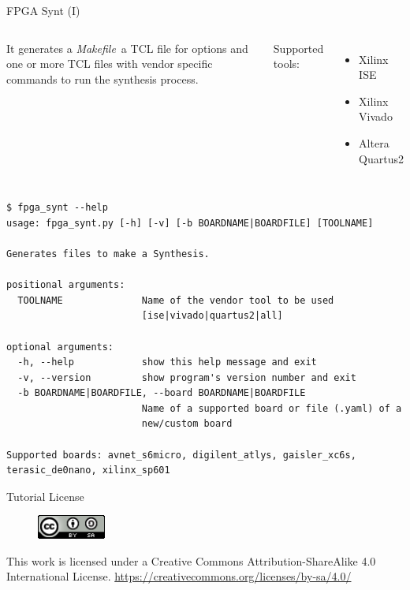 \documentclass{beamer}
\newcommand{\makefile}       {\textit{Makefile}}
\begin{document}

\begin{frame}[fragile]{FPGA Synt (I)}
  \begin{columns}
      \begin{block}{}
        \small
        It generates a \makefile\ a TCL file for options and one or more TCL files
        with vendor specific commands to run the synthesis process.
      \end{block}{}
      \small Supported tools:
      \begin{itemize}
        \tiny
        \item Xilinx ISE
        \item Xilinx Vivado
        \item Altera Quartus2
      \end{itemize}
  \end{columns}
  \scriptsize
  \begin{verbatim}
$ fpga_synt --help
usage: fpga_synt.py [-h] [-v] [-b BOARDNAME|BOARDFILE] [TOOLNAME]

Generates files to make a Synthesis.

positional arguments:
  TOOLNAME              Name of the vendor tool to be used
                        [ise|vivado|quartus2|all]

optional arguments:
  -h, --help            show this help message and exit
  -v, --version         show program's version number and exit
  -b BOARDNAME|BOARDFILE, --board BOARDNAME|BOARDFILE
                        Name of a supported board or file (.yaml) of a
                        new/custom board

Supported boards: avnet_s6micro, digilent_atlys, gaisler_xc6s,
terasic_de0nano, xilinx_sp601
  \end{verbatim}
\end{frame}



\begin{frame}{Tutorial License}
  \begin{figure}[!t]
    \includegraphics[width=0.2\textwidth]{../images/cc-by-sa.png}
  \end{figure}
  \centering
  This work is licensed under a Creative Commons Attribution-ShareAlike 4.0 International License.
  \url{https://creativecommons.org/licenses/by-sa/4.0/}
\end{frame}
\end{document}
